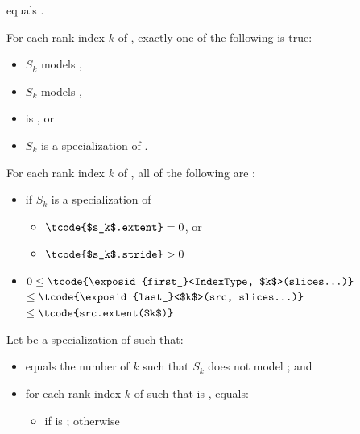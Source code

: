 \begin{itemdescr}
\pnum
\constraints
{} equals .

\pnum
\mandates
For each rank index $k$ of ,
exactly one of the following is true:
\begin{itemize}
\item $S_k$ models ,
\item $S_k$ models ,
\item {} is , or
\item $S_k$ is a specialization of .
\end{itemize}

\pnum
\expects
For each rank index $k$ of ,
all of the following are :
\begin{itemize}
\item
if $S_k$ is a specialization of 
  \begin{itemize}
  \item $\tcode{$s_k$.extent} = 0$, or
  \item $\tcode{$s_k$.stride} > 0$
  \end{itemize}
\item
$0 \le \tcode{\exposid{first_}<IndexType, $k$>(slices...)}$
$\le \tcode{\exposid{last_}<$k$>(src, slices...)}$
$\le \tcode{src.extent($k$)}$
\end{itemize}

\pnum
Let  be a specialization of  such that:

\begin{itemize}
\item
 equals the number of $k$ such that
$S_k$ does not model ; and

\item
for each rank index $k$ of  such that
 is ,
 equals:

  \begin{itemize}
  \item
  if  is ;
  otherwise


\end{itemize}
\end{itemize}
\end{itemdescr}
